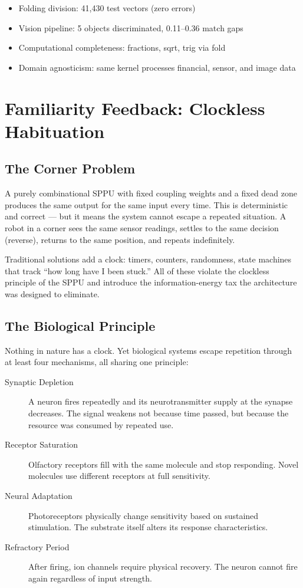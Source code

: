 \documentclass[11pt,a4paper]{article}
\begin{document}
\begin{itemize}
    \item Folding division: 41,430 test vectors (zero errors)
    \item Vision pipeline: 5 objects discriminated, 0.11--0.36 match gaps
    \item Computational completeness: fractions, sqrt, trig via fold
    \item Domain agnosticism: same kernel processes financial, sensor, and image data
\end{itemize}

\section{Familiarity Feedback: Clockless Habituation}

\subsection{The Corner Problem}

A purely combinational SPPU with fixed coupling weights and a fixed dead zone produces the same output for the same input every time. This is deterministic and correct --- but it means the system cannot escape a repeated situation. A robot in a corner sees the same sensor readings, settles to the same decision (reverse), returns to the same position, and repeats indefinitely.

Traditional solutions add a clock: timers, counters, randomness, state machines that track ``how long have I been stuck.'' All of these violate the clockless principle of the SPPU and introduce the information-energy tax the architecture was designed to eliminate.

\subsection{The Biological Principle}

Nothing in nature has a clock. Yet biological systems escape repetition through at least four mechanisms, all sharing one principle:

\begin{description}
    \item[Synaptic Depletion] A neuron fires repeatedly and its neurotransmitter supply at the synapse decreases. The signal weakens not because time passed, but because the resource was consumed by repeated use.
    \item[Receptor Saturation] Olfactory receptors fill with the same molecule and stop responding. Novel molecules use different receptors at full sensitivity.
    \item[Neural Adaptation] Photoreceptors physically change sensitivity based on sustained stimulation. The substrate itself alters its response characteristics.
    \item[Refractory Period] After firing, ion channels require physical recovery. The neuron cannot fire again regardless of input strength.
\end{description}
\end{document}
